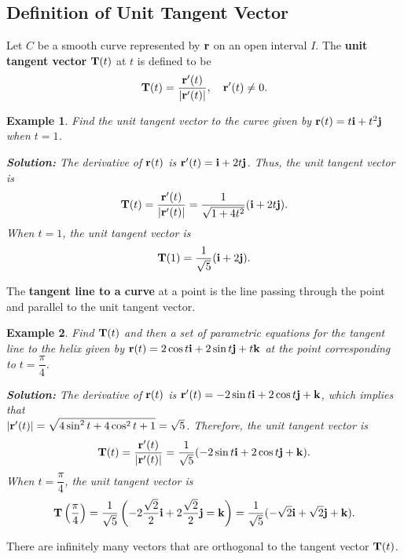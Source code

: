 \documentclass[titlepage,a4paper,12pt]{report}
\newtheorem{example}{Example}[section]
\begin{document}
\subsection{Definition of Unit Tangent Vector}
Let $C$ be a smooth curve represented by ${\bf{r}}$ on an open interval $I$. The \textbf{unit tangent vector} ${\bf{T}}(t)$ at $t$ is defined to be 
\[{\bf{T}}(t)=\dfrac{{\bf{r}}'(t)}{|{\bf{r}}'(t)|}, \quad {\bf{r}}'(t)\neq 0.\]
\begin{example}
Find the unit tangent vector to the curve given by ${\bf{r}}(t)=t{\bf{i}}+t^2{\bf{j}}$ when $t=1$.

\noindent \textbf{Solution:} The derivative of ${\bf{r}}(t)$ is ${\bf{r}}'(t)={\bf{i}}+2t{\bf{j}}$. Thus, the unit tangent vector is 
\[{\bf{T}}(t)=\dfrac{{\bf{r}}'(t)}{|{\bf{r}}'(t)|}=\dfrac{1}{\sqrt{1+4t^2}}({\bf{i}}+2t{\bf{j}}).\] When $t=1$, the unit tangent vector is 
\[{\bf{T}}(1)=\dfrac{1}{\sqrt{5}}({\bf{i}}+2{\bf{j}}).\] 
\end{example}
\noindent The \textbf{tangent line to a curve} at a point is the line passing through the point and parallel to the unit tangent vector.
\begin{example}
Find ${\bf{T}}(t)$ and then a set of parametric equations for the tangent line to the helix given by ${\bf{r}}(t)=2\cos t {\bf{i}}+2\sin t {\bf{j}}+t{\bf{k}}$ at the point corresponding to $t=\dfrac{\pi}{4}$.

\noindent \textbf{Solution:} The derivative of ${\bf{r}}(t)$ is ${\bf{r}}'(t)=-2\sin t {\bf{i}}+2\cos t {\bf{j}}+{\bf{k}}$, which implies that \\$|{\bf{r}}'(t)|=\sqrt{4\sin ^2 t +4\cos ^2 t +1}=\sqrt{5}$. Therefore, the unit tangent vector is 
\[{\bf{T}}(t)=\dfrac{{\bf{r}}'(t)}{|{\bf{r}}'(t)|}=\dfrac{1}{\sqrt{5}}(-2\sin t {\bf{i}}+2\cos t {\bf{j}}+{\bf{k}}).\]
When $t=\dfrac{\pi}{4}$, the unit tangent vector is 
\[{\bf{T}}\left(\dfrac{\pi}{4}\right)=\dfrac{1}{\sqrt{5}}\left(-2\dfrac{\sqrt{2}}{2}{\bf{i}}+2\dfrac{\sqrt{2}}{2}{\bf{j}}={\bf{k}}\right)=\dfrac{1}{\sqrt{5}}(-\sqrt{2}{\bf{i}}+\sqrt{2}{\bf{j}}+{\bf{k}}).\]
\end{example}
\noindent There are infinitely many vectors that are orthogonal to the tangent vector ${\bf{T}}(t)$.
\end{document}
